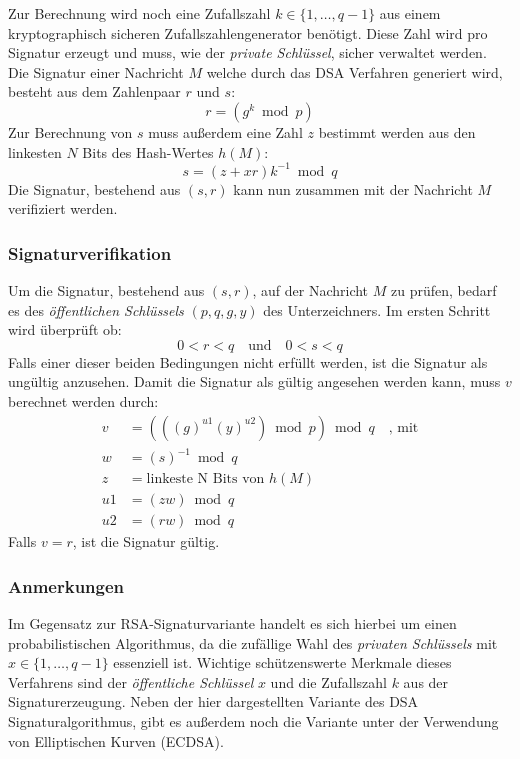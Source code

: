 \documentclass[11pt,a4paper,ngerman]{scrreprt}
\begin{document}
Zur Berechnung wird noch eine Zufallszahl $k \in \{ 1, \ldots, q - 1 \}$ aus einem kryptographisch sicheren Zufallszahlengenerator benötigt. Diese Zahl wird pro Signatur erzeugt und muss, wie der \emph{private Schlüssel}, sicher verwaltet werden. Die Signatur einer Nachricht $M$ welche durch das DSA Verfahren generiert wird, besteht aus dem Zahlenpaar $r$ und $s$:
\[
    r = (g^k \bmod p)
\]
Zur Berechnung von $s$ muss außerdem eine Zahl $z$ bestimmt werden aus den linkesten $N$ Bits des Hash-Wertes $h(M)$:
\[
    s = (z + xr)k^{-1} \bmod q
\]
Die Signatur, bestehend aus $(s, r)$ kann nun zusammen mit der Nachricht $M$ verifiziert werden.
\subsubsection{Signaturverifikation}
Um die Signatur, bestehend aus $(s, r)$, auf der Nachricht $M$ zu prüfen, bedarf es des \emph{öffentlichen Schlüssels} $(p, q, g, y)$ des Unterzeichners. Im ersten Schritt wird überprüft ob: 
\[
    0 < r < q \quad\textrm{und}\quad 0 < s < q
\]
Falls einer dieser beiden Bedingungen nicht erfüllt werden, ist die Signatur als ungültig anzusehen. Damit die Signatur als gültig angesehen werden kann, muss $v$ berechnet werden durch:
\begin{align*}
    v& = (((g)^{u1}(y)^{u2}) \bmod p) \bmod q \quad\textrm{, mit}\\
    w& = (s)^{-1} \bmod q \\
    z& = \textrm{linkeste N Bits von $h(M)$} \\
    u1& = (zw) \bmod q \\
    u2& = (rw) \bmod q
\end{align*}
Falls $v = r$, ist die Signatur gültig.
\subsubsection{Anmerkungen}
Im Gegensatz zur RSA-Signaturvariante handelt es sich hierbei um einen probabilistischen Algorithmus, da die zufällige Wahl des \emph{privaten Schlüssels} mit $x \in \{1, \ldots, q - 1 \}$ essenziell ist. Wichtige schützenswerte Merkmale dieses Verfahrens sind der \emph{öffentliche Schlüssel} $x$ und die Zufallszahl $k$ aus der Signaturerzeugung. Neben der hier dargestellten Variante des DSA Signaturalgorithmus, gibt es außerdem noch die Variante unter der Verwendung von Elliptischen Kurven (ECDSA).
\end{document}
